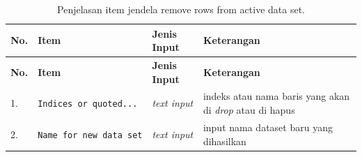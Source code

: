 \documentclass[12pt,]{krantz}
\begin{document}
\begin{longtable}[]{@{}llll@{}}
\caption{\label{tab:remove} Penjelasan item jendela remove rows from active data set.}\tabularnewline
\toprule
\begin{minipage}[b]{0.04\columnwidth}\raggedright
\textbf{No.}\strut
\end{minipage} & \begin{minipage}[b]{0.14\columnwidth}\raggedright
\textbf{Item}\strut
\end{minipage} & \begin{minipage}[b]{0.09\columnwidth}\raggedright
\textbf{Jenis Input}\strut
\end{minipage} & \begin{minipage}[b]{0.61\columnwidth}\raggedright
\textbf{Keterangan}\strut
\end{minipage}\tabularnewline
\midrule
\endfirsthead
\toprule
\begin{minipage}[b]{0.04\columnwidth}\raggedright
\textbf{No.}\strut
\end{minipage} & \begin{minipage}[b]{0.14\columnwidth}\raggedright
\textbf{Item}\strut
\end{minipage} & \begin{minipage}[b]{0.09\columnwidth}\raggedright
\textbf{Jenis Input}\strut
\end{minipage} & \begin{minipage}[b]{0.61\columnwidth}\raggedright
\textbf{Keterangan}\strut
\end{minipage}\tabularnewline
\midrule
\endhead
\begin{minipage}[t]{0.04\columnwidth}\raggedright
1.\strut
\end{minipage} & \begin{minipage}[t]{0.14\columnwidth}\raggedright
\texttt{Indices\ or\ quoted...}\strut
\end{minipage} & \begin{minipage}[t]{0.09\columnwidth}\raggedright
\emph{text input}\strut
\end{minipage} & \begin{minipage}[t]{0.61\columnwidth}\raggedright
indeks atau nama baris yang akan di \emph{drop} atau di hapus\strut
\end{minipage}\tabularnewline
\begin{minipage}[t]{0.04\columnwidth}\raggedright
2.\strut
\end{minipage} & \begin{minipage}[t]{0.14\columnwidth}\raggedright
\texttt{Name\ for\ new\ data\ set}\strut
\end{minipage} & \begin{minipage}[t]{0.09\columnwidth}\raggedright
\emph{text input}\strut
\end{minipage} & \begin{minipage}[t]{0.61\columnwidth}\raggedright
input nama dataset baru yang dihasilkan\strut
\end{minipage}\tabularnewline
\bottomrule
\end{longtable}
\end{document}
